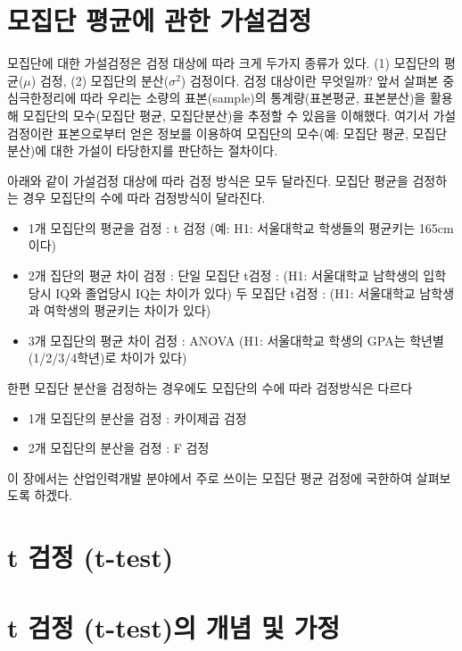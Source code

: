 \documentclass[
]{book}
\providecommand{\tightlist}{%
  \setlength{\itemsep}{0pt}\setlength{\parskip}{0pt}}
\begin{document}
\section{모집단 평균에 관한 가설검정}\label{uxbaa8uxc9d1uxb2e8-uxd3c9uxade0uxc5d0-uxad00uxd55c-uxac00uxc124uxac80uxc815}

모집단에 대한 가설검정은 검정 대상에 따라 크게 두가지 종류가 있다. (1) 모집단의 평균(\(\mu\)) 검정, (2) 모집단의 분산(\(\sigma^2\)) 검정이다. 검정 대상이란 무엇일까? 앞서 살펴본 중심극한정리에 따라 우리는 소량의 표본(sample)의 통계량(표본평균, 표본분산)을 활용해 모집단의 모수(모집단 평균, 모집단분산)을 추정할 수 있음을 이해했다. 여기서 가설검정이란 표본으로부터 얻은 정보를 이용하여 모집단의 모수(예: 모집단 평균, 모집단 분산)에 대한 가설이 타당한지를 판단하는 절차이다.

아래와 같이 가설검정 대상에 따라 검정 방식은 모두 달라진다. 모집단 평균을 검정하는 경우 모집단의 수에 따라 검정방식이 달라진다.

\begin{itemize}
\tightlist
\item
  1개 모집단의 평균을 검정 : t 검정 (예: H1: 서울대학교 학생들의 평균키는 165cm이다)
\item
  2개 집단의 평균 차이 검정 :
  단일 모집단 t검정 : (H1: 서울대학교 남학생의 입학당시 IQ와 졸업당시 IQ는 차이가 있다)
  두 모집단 t검정 : (H1: 서울대학교 남학생과 여학생의 평균키는 차이가 있다)
\item
  3개 모집단의 평균 차이 검정 : ANOVA (H1: 서울대학교 학생의 GPA는 학년별(1/2/3/4학년)로 차이가 있다)
\end{itemize}

한편 모집단 분산을 검정하는 경우에도 모집단의 수에 따라 검정방식은 다르다

\begin{itemize}
\tightlist
\item
  1개 모집단의 분산을 검정 : 카이제곱 검정
\item
  2개 모집단의 분산을 검정 : F 검정
\end{itemize}

이 장에서는 산업인력개발 분야에서 주로 쓰이는 모집단 평균 검정에 국한하여 살펴보도록 하겠다.

\section{t 검정 (t-test)}\label{t-uxac80uxc815-t-test}

\section{t 검정 (t-test)의 개념 및 가정}\label{t-uxac80uxc815-t-testuxc758-uxac1cuxb150-uxbc0f-uxac00uxc815}
\end{document}

